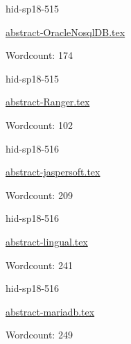 

\begin{IU}

hid-sp18-515

\href{https://github.com/cloudmesh-community/hid-sp18-515/blob/master//technology/abstract-OracleNosqlDB.tex}{abstract-OracleNosqlDB.tex}

 

Wordcount: 174

\end{IU}



\begin{IU}

hid-sp18-515

\href{https://github.com/cloudmesh-community/hid-sp18-515/blob/master//technology/abstract-Ranger.tex}{abstract-Ranger.tex}

 

Wordcount: 102

\end{IU}



\begin{IU}

hid-sp18-516

\href{https://github.com/cloudmesh-community/hid-sp18-516/blob/master//technology/abstract-jaspersoft.tex}{abstract-jaspersoft.tex}

 

Wordcount: 209

\end{IU}



\begin{IU}

hid-sp18-516

\href{https://github.com/cloudmesh-community/hid-sp18-516/blob/master//technology/abstract-lingual.tex}{abstract-lingual.tex}

 

Wordcount: 241

\end{IU}



\begin{IU}

hid-sp18-516

\href{https://github.com/cloudmesh-community/hid-sp18-516/blob/master//technology/abstract-mariadb.tex}{abstract-mariadb.tex}

 

Wordcount: 249

\end{IU}

